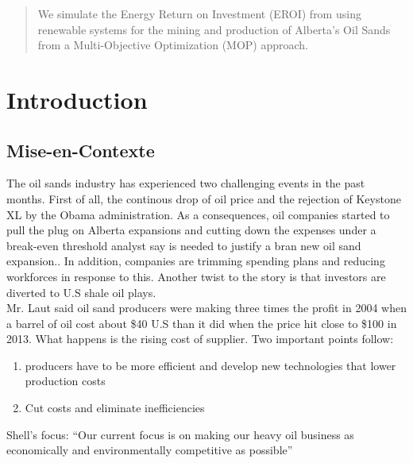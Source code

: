 \documentclass[12pt]{article}
\begin{document}
\maketitle

\begin{abstract}
We simulate the Energy Return on Investment (EROI) from using renewable systems for the mining and production of Alberta's Oil Sands from a Multi-Objective Optimization (MOP) approach. 
\end{abstract}

\tableofcontents
\newpage

\section{Introduction}

\subsection{Mise-en-Contexte}
The oil sands industry has experienced two challenging events in the past months. First of all, the continous drop of oil price and the rejection of Keystone XL by the Obama administration. As a consequences, oil companies started to pull the plug on Alberta expansions and cutting down the expenses under a break-even threshold analyst say is needed to justify a bran new oil sand expansion.. In addition, companies are trimming spending plans and reducing workforces in response to this. Another twist to the story is that investors are diverted to U.S shale oil plays.  \\

  Mr. Laut said oil sand producers were making three times the profit in 2004 when a barrel of oil cost about \$40 U.S than it did when the price hit close to \$100 in 2013. What happens is the rising cost of supplier. Two important points follow:
  
  \begin{enumerate}
  \item producers have to be more efficient and develop new technologies that lower production costs
  \item Cut costs and eliminate inefficiencies
  \end{enumerate}

Shell's focus: ``Our current focus is on making our heavy oil business as economically and environmentally competitive as possible''
\end{document}
